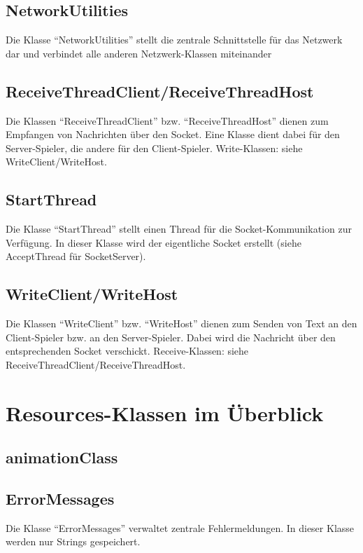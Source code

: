 \documentclass[11pt]{article} %
\begin{document}
\subsection{NetworkUtilities}
Die Klasse \enquote{NetworkUtilities} stellt die zentrale Schnittstelle für das Netzwerk dar und verbindet alle anderen Netzwerk-Klassen miteinander 

\subsection{ReceiveThreadClient/ReceiveThreadHost}
Die Klassen \enquote{ReceiveThreadClient} bzw. \enquote{ReceiveThreadHost} dienen zum Empfangen von Nachrichten über den Socket. Eine Klasse dient dabei für den Server-Spieler, die andere für den Client-Spieler. Write-Klassen: siehe WriteClient/WriteHost. 

\subsection{StartThread}
Die Klasse \enquote{StartThread} stellt einen Thread für die Socket-Kommunikation zur Verfügung. In dieser Klasse wird der eigentliche Socket erstellt (siehe AcceptThread für SocketServer).

\subsection{WriteClient/WriteHost}
Die Klassen \enquote{WriteClient} bzw. \enquote{WriteHost} dienen zum Senden von Text an den Client-Spieler bzw. an den Server-Spieler. Dabei wird die Nachricht über den entsprechenden Socket verschickt. Receive-Klassen: siehe ReceiveThreadClient/ReceiveThreadHost.

\section{Resources-Klassen im Überblick}

\subsection{animationClass}

\subsection{ErrorMessages}
Die Klasse \enquote{ErrorMessages} verwaltet zentrale Fehlermeldungen. In dieser Klasse werden nur Strings gespeichert.
\end{document}
